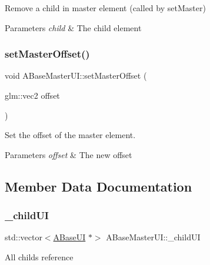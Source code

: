 Remove a child in master element (called by set\+Master) 


\begin{DoxyParams}{Parameters}
{\em child} & The child element \\
\hline
\end{DoxyParams}
\mbox{\label{class_a_base_master_u_i_ad98439ff88bce6f13311f17444aea6f3}} 
\subsubsection{\texorpdfstring{set\+Master\+Offset()}{setMasterOffset()}}
{\footnotesize\ttfamily void A\+Base\+Master\+U\+I\+::set\+Master\+Offset (\begin{DoxyParamCaption}\item[{glm\+::vec2}]{offset }\end{DoxyParamCaption})}



Set the offset of the master element. 


\begin{DoxyParams}{Parameters}
{\em offset} & The new offset \\
\hline
\end{DoxyParams}


\subsection{Member Data Documentation}
\mbox{\label{class_a_base_master_u_i_a8e67f5e6780889a29464f301f8d53e9a}} 
\subsubsection{\texorpdfstring{\+\_\+child\+UI}{\_childUI}}
{\footnotesize\ttfamily std\+::vector$<$\hyperlink{class_a_base_u_i}{A\+Base\+UI} $\ast$$>$ A\+Base\+Master\+U\+I\+::\+\_\+child\+UI\hspace{0.3cm}{\ttfamily [protected]}}

All childs reference \mbox{\label{class_a_base_master_u_i_a2a882142b0df3f748eef03dad099fc9c}} 
